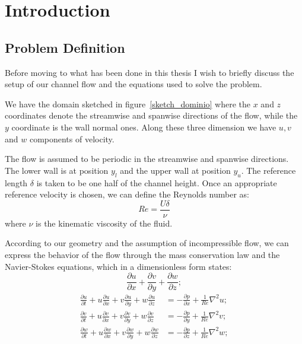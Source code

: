 \chapter{Introduction}
\section{Problem Definition}
\pagestyle{headings}

Before moving to what has been done in this thesis I wish to briefly discuss the setup of our channel flow and the equations used to solve the problem.

We have the domain sketched in figure~\ref{sketch_dominio} where the $x$ and $z$ coordinates denote the streamwise and spanwise directions of the flow, while the $y$ coordinate is the wall normal ones.
Along these three dimension we have $u,v$ and $w$ components of velocity.

The flow is assumed to be periodic in the streamwise and spanwise directions. The lower wall is at position $y_l$ and the upper wall at position $y_u$. The reference length $\delta$ is taken to be one half of the channel height.
Once an appropriate reference velocity is chosen, we can define the Reynolds number as:
\[
Re = \frac{U\delta}{\nu}
\]
where $\nu$ is the kinematic viscosity of the fluid.

According to our geometry and the assumption of incompressible flow, we can express the behavior of the flow through the mass conservation law and the Navier-Stokes equations, which in a dimensionless form states:\\
\begin{equation}
\frac{\partial u}{\partial x} + \frac{\partial v}{\partial y} + \frac{\partial w}{\partial z};
\label{mass:cons}
\end{equation}
\begin{subequations}
\label{eqn:schema}
\begin{align}
\frac{\partial u}{\partial t} + u\frac{\partial u}{\partial x} + v\frac{\partial u}{\partial y} + w\frac{\partial u}{\partial z} &= 
- \frac{\partial p}{\partial x} + \frac{1}{Re} \nabla^{2}u;  \\
\frac{\partial v}{\partial t} + u\frac{\partial v}{\partial x} + v\frac{\partial v}{\partial y} + w\frac{\partial v}{\partial z} &= 
- \frac{\partial p}{\partial y} + \frac{1}{Re}\nabla^{2}v;\\
\frac{\partial w}{\partial t} + u\frac{\partial w}{\partial x} + v\frac{\partial w}{\partial y} + w\frac{\partial w}{\partial z} &= 
- \frac{\partial p}{\partial z} + \frac{1}{Re}\nabla^{2}w;
\end{align}
\end{subequations}

